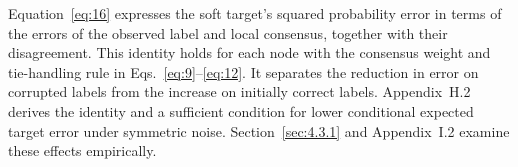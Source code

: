 Equation~\eqref{eq:16} expresses the soft target's squared probability error in terms of the errors of the observed label and local consensus, together with their disagreement. This identity holds for each node with the consensus weight and tie-handling rule in Eqs.~\eqref{eq:9}--\eqref{eq:12}. It separates the reduction in error on corrupted labels from the increase on initially correct labels. Appendix~H.2 derives the identity and a sufficient condition for lower conditional expected target error under symmetric noise. Section~\ref{sec:4.3.1} and Appendix~I.2 examine these effects empirically.

